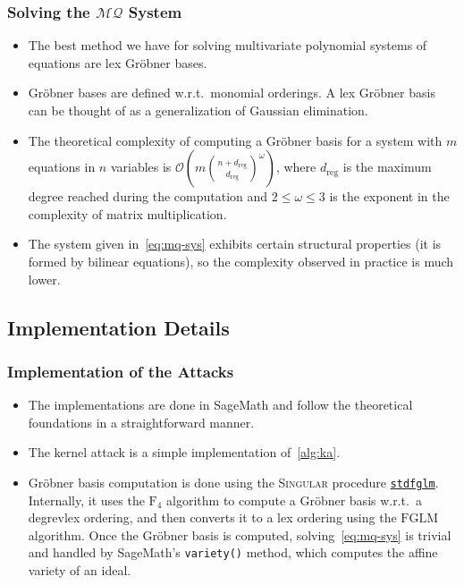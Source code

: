 \documentclass[serif, hyperref={unicode, breaklinks}, xcolor={x11names, psnames,
  dvipsnames, table}, usepdftitle=false]{beamer}
\let\chyperref\cref
\renewcommand{\cref}[1]{\hyperlink{#1}{\chyperref{#1}}}
\newcommand{\MQ}{\ensuremath{\mathcal{MQ}}}
\begin{document}
\begin{frame}
  \frametitle{Solving the \MQ{} System}
  \begin{itemize}
  \item The best method we have for solving multivariate polynomial systems of
    equations are lex Gröbner bases.
  \item Gröbner bases are defined w.r.t.\ monomial orderings.  A lex Gröbner
    basis can be thought of as a generalization of Gaussian elimination.
  \item The theoretical complexity of computing a Gröbner basis for a system
    with $m$ equations in $n$ variables is
    $\mathcal{O}\left(m \binom{n +
        d_{\mathrm{reg}}}{d_{\mathrm{reg}}}^\omega\right)$, where
    $d_{\mathrm{reg}}$ is the maximum degree reached during the computation and
    $2 \le \omega \le 3$ is the exponent in the complexity of matrix
    multiplication.
  \item The system given in~\eqref{eq:mq-sys} exhibits certain structural
    properties (it is formed by bilinear equations), so the complexity observed
    in practice is much lower.
  \end{itemize}
\end{frame}

\subsection{Implementation Details}
\begin{frame}
  \frametitle{Implementation of the Attacks}
  \begin{itemize}
  \item The implementations are done in SageMath and follow the theoretical
    foundations in a straightforward manner.
  \item The kernel attack is a simple implementation of~\cref{alg:ka}.
  \item Gröbner basis computation is done using the \textsc{Singular} procedure
    \href{https://www.singular.uni-kl.de/Manual/4-0-2/sing_403.htm}{\texttt{stdfglm}}.
    Internally, it uses the $\mathrm{F}_4$ algorithm to compute a Gröbner basis
    w.r.t.\ a degrevlex ordering, and then converts it to a lex ordering using
    the $\mathrm{FGLM}$ algorithm.  Once the Gröbner basis is computed,
    solving~\eqref{eq:mq-sys} is trivial and handled by SageMath's
    \texttt{variety()} method, which computes the affine variety of an ideal.
  \end{itemize}
\end{frame}
\end{document}
